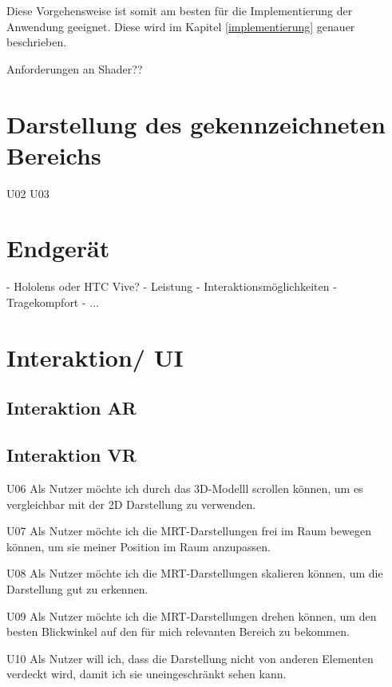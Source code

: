 Diese Vorgehensweise ist somit am besten für die Implementierung der Anwendung geeignet.
Diese wird im Kapitel \ref{implementierung} genauer beschrieben.

Anforderungen an Shader??


\section{Darstellung des gekennzeichneten Bereichs}


U02 U03  


\section{Endgerät}

- Hololens oder HTC Vive?
- Leistung
- Interaktionsmöglichkeiten
- Tragekompfort
- ...

\section{Interaktion/ UI} 



\subsection{Interaktion AR}

\subsection{Interaktion VR}

U06  Als Nutzer möchte ich durch das 3D-Modelll scrollen können, um es vergleichbar mit der 2D Darstellung zu verwenden.

U07  Als Nutzer möchte ich die MRT-Darstellungen frei im Raum bewegen können, um sie meiner Position im Raum anzupassen.

U08 Als Nutzer möchte ich die MRT-Darstellungen skalieren können, um die Darstellung gut zu erkennen.

U09  Als Nutzer möchte ich die MRT-Darstellungen drehen können, um den besten Blickwinkel auf den für mich relevanten Bereich zu bekommen. 

U10  Als Nutzer will ich, dass die Darstellung nicht von anderen Elementen verdeckt wird, damit ich sie uneingeschränkt sehen kann. 

